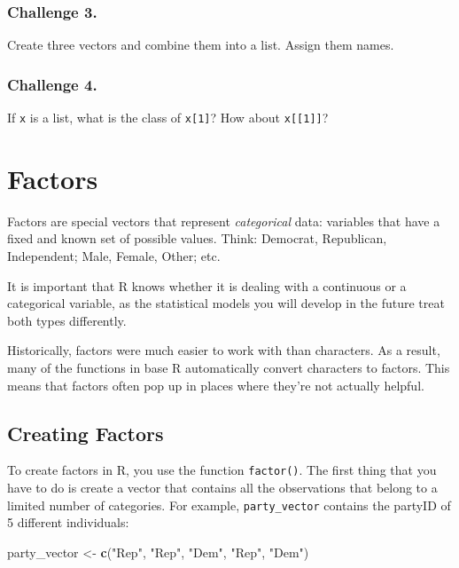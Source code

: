 \documentclass[]{book}
\newenvironment{Shaded}{\begin{snugshade}}{\end{snugshade}}
\newcommand{\KeywordTok}[1]{\textcolor[rgb]{0.13,0.29,0.53}{\textbf{#1}}}
\newcommand{\StringTok}[1]{\textcolor[rgb]{0.31,0.60,0.02}{#1}}
\newcommand{\NormalTok}[1]{#1}
\begin{document}
\subsubsection*{Challenge 3.}\label{challenge-3.-1}

Create three vectors and combine them into a list. Assign them names.

\subsubsection*{Challenge 4.}\label{challenge-4.}

If \texttt{x} is a list, what is the class of \texttt{x{[}1{]}}? How
about \texttt{x{[}{[}1{]}{]}}?

\hypertarget{factors}{\section{Factors}\label{factors}}

Factors are special vectors that represent \emph{categorical} data:
variables that have a fixed and known set of possible values. Think:
Democrat, Republican, Independent; Male, Female, Other; etc.

It is important that R knows whether it is dealing with a continuous or
a categorical variable, as the statistical models you will develop in
the future treat both types differently.

Historically, factors were much easier to work with than characters. As
a result, many of the functions in base R automatically convert
characters to factors. This means that factors often pop up in places
where they're not actually helpful.

\subsection{Creating Factors}\label{creating-factors}

To create factors in R, you use the function \texttt{factor()}. The
first thing that you have to do is create a vector that contains all the
observations that belong to a limited number of categories. For example,
\texttt{party\_vector} contains the partyID of 5 different individuals:

\begin{Shaded}
\begin{Highlighting}[]
\NormalTok{party_vector <-}\StringTok{ }\KeywordTok{c}\NormalTok{(}\StringTok{"Rep"}\NormalTok{, }\StringTok{"Rep"}\NormalTok{, }\StringTok{"Dem"}\NormalTok{, }\StringTok{"Rep"}\NormalTok{, }\StringTok{"Dem"}\NormalTok{)}
\end{Highlighting}
\end{Shaded}
\end{document}
